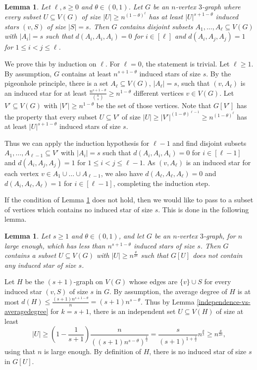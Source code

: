 \documentclass[11pt]{article}
\let\oldendproof\endproof
\renewenvironment{proof}[1][\proofname]{%
	\oldproof[\bf #1]%
}{\oldendproof}
\theoremstyle{plain}
\newtheorem{lemma}[theorem]{Lemma}
\begin{document}
\begin{lemma} \label{main-case-1}
    Let $\ell, s \geq 0$ and $\theta \in (0,1)$. Let $G$ be an $n$-vertex $3$-graph where every subset $U \subseteq V(G)$ of size $|U| \geq n^{(1-\theta)^{\ell}}$ has at least $|U|^{s+1-\theta}$ induced stars $(v,S)$ of size $|S| = s$. Then $G$ contains disjoint subsets $A_1,\dots,A_{\ell} \subseteq V(G)$ with $|A_i|=s$ such that $d(A_i,A_i,A_i)=0$ for $i \in [\ell]$ and $d(A_i,A_j,A_j)=1$ for $1\leq i < j \leq \ell$.
\end{lemma}
\begin{proof}
    We prove this by induction on $\ell$. For $\ell=0$, the statement is trivial. Let $\ell \geq 1$.
    By assumption, $G$ contains at least $n^{s+1-\theta}$ induced stars of size $s$. By the pigeonhole principle, there is a set $A_{\ell} \subseteq V(G)$, $|A_{\ell}| = s$, such that $(v,A_{\ell})$ is an induced star for at least $\frac{n^{s+1-\theta}}{\binom{n}{s}} \geq n^{1-\theta}$ different vertices $v \in V(G)$. Let $V' \subseteq V(G)$ with $|V'| \geq n^{1-\theta}$ be the set of those vertices. Note that $G[V']$ has the property that every subset $U \subseteq V'$ of size $|U| \geq |V'|^{(1-\theta)^{\ell-1}} \geq n^{(1-\theta)^\ell}$ has at least $|U|^{s+1-\theta}$ induced stars of size $s$.
    
    Thus we can apply the induction hypothesis for $\ell-1$ and find disjoint subsets $A_1,\dots,A_{\ell-1} \subseteq V'$ with $|A_i|=s$ such that $d(A_i,A_i,A_i)=0$ for $i \in [\ell-1]$ and $d(A_i,A_j,A_j)=1$ for $1\leq i < j \leq \ell-1$. As $(v,A_{\ell})$ is an induced star for each vertex $v \in A_1 \cup \dots \cup A_{\ell-1}$, we also have $d(A_{\ell},A_{\ell},A_{\ell})=0$ and $d(A_i,A_{\ell},A_{\ell})=1$ for $i \in [\ell-1]$, completing the induction step.
\end{proof}

If the condition of Lemma \ref{main-case-1} does not hold, then we would like to pass to a subset of vertices which contains no induced star of size $s$. This is done in the following lemma. 

\begin{lemma} \label{no-small-induced-stars}
    Let $s \geq 1$ and $\theta \in (0,1)$, and let $G$ be an $n$-vertex $3$-graph, for $n$ large enough, which has less than $n^{s+1-\theta}$ induced stars of size $s$. Then $G$ contains a subset $U \subseteq V(G)$ with $|U| \geq n^{\frac{\theta}{2s}}$ such that $G[U]$ does not contain any induced star of size $s$.
\end{lemma}
\begin{proof}
    Let $H$ be the $(s+1)$-graph on $V(G)$ whose edges are $\{v\} \cup S$ for every induced star $(v,S)$ of size $s$ in $G$. By assumption, the average degree of $H$ is at most $d(H) \leq \frac{(s+1) n^{s+1-\theta}}{n} = (s+1) n^{s-\theta}$. Thus by Lemma \ref{independence-vs-averagedegree} for $k=s+1$, there is an independent set $U \subseteq V(H)$ of size at least 
    $$|U| \geq \left(1-\frac{1}{s+1}\right)\frac{n}{((s+1) n^{s-\theta})^{\frac{1}{s}}} = \frac{s}{(s+1)^{1+\frac{1}{s}}} n^{\frac{\theta}{s}} \geq n^{\frac{\theta}{2s}},$$ 
    using that $n$ is large enough. By definition of $H$, there is no induced star of size $s$ in $G[U]$.
\end{proof}
\end{document}
